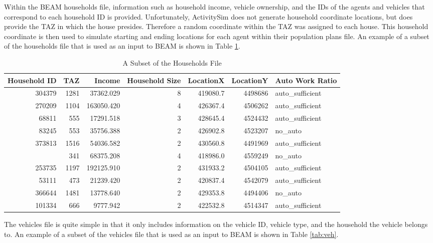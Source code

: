\documentclass[3p, authoryear, review]{elsarticle} %
\begin{document}
Within the BEAM households file, information such as household income, vehicle ownership, and the IDs of the agents and vehicles that correspond to each household ID is provided. Unfortunately, ActivitySim does not generate household coordinate locations, but does provide the TAZ in which the house presides. Therefore a random coordinate within the TAZ was assigned to each house. This household coordinate is then used to simulate starting and ending locations for each agent within their population plans file. An example of a subset of the households file that is used as an input to BEAM is shown in Table \ref{tab:house}.

\begin{table}

\caption{\label{tab:house}A Subset of the Households File}
\centering
\begin{tabular}[t]{rrrrrrl}
\toprule
Household ID & TAZ & Income & Household Size & LocationX & LocationY & Auto Work Ratio\\
\midrule
304379 & 1281 & 37362.029 & 8 & 419080.7 & 4498686 & auto\_sufficient\\
270209 & 1104 & 163050.420 & 4 & 426367.4 & 4506262 & auto\_sufficient\\
68811 & 555 & 17291.518 & 3 & 428645.4 & 4524432 & auto\_sufficient\\
83245 & 553 & 35756.388 & 2 & 426902.8 & 4523207 & no\_auto\\
373813 & 1516 & 54036.582 & 2 & 430560.8 & 4491969 & auto\_sufficient\\
\addlinespace
574302 & 341 & 68375.208 & 4 & 418986.0 & 4559249 & no\_auto\\
253735 & 1197 & 192125.910 & 2 & 431933.2 & 4504105 & auto\_sufficient\\
53111 & 473 & 21239.420 & 2 & 420837.4 & 4542079 & auto\_sufficient\\
366644 & 1481 & 13778.640 & 2 & 429353.8 & 4494406 & no\_auto\\
101334 & 666 & 9777.942 & 2 & 422532.8 & 4514347 & auto\_sufficient\\
\bottomrule
\end{tabular}
\end{table}

The vehicles file is quite simple in that it only includes information on the vehicle ID, vehicle type, and the household the vehicle belongs to. An example of a subset of the vehicles file that is used as an input to BEAM is shown in Table \ref{tab:veh}.
\end{document}
